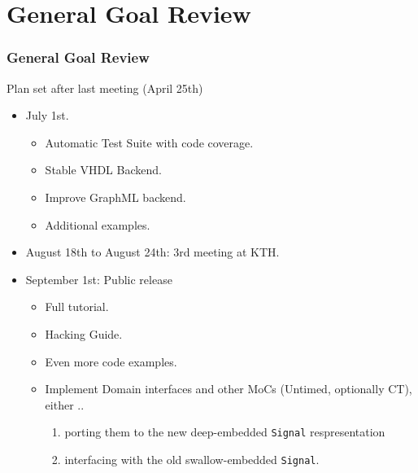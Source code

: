 \documentclass{beamer}
\begin{document}
\section{General Goal Review}
\begin{frame}
  \frametitle{General Goal Review}
  Plan set after last meeting (April 25th)
  \begin{itemize}
  \item<1-> July 1st.
    \begin{itemize}
    \item Automatic Test Suite with code
      coverage. 
    \item Stable VHDL Backend. 
    \item Improve GraphML backend. 
    \item Additional examples. 
    \end{itemize}
  \item<3-> August 18th to August 24th: 3rd meeting at KTH.
    
  \item<4-> September 1st: Public release
    \begin{itemize}
      \item Full tutorial. 
      \item Hacking Guide. 
      \item Even more code examples. 
      \item Implement Domain interfaces and other MoCs (Untimed,
        optionally CT), either
        .. 
        \begin{enumerate}
        \item porting them to the new deep-embedded \texttt{Signal} respresentation
        \item interfacing with the old swallow-embedded \texttt{Signal}.
        \end{enumerate}
    \end{itemize}
  \end{itemize}
\end{frame}
\end{document}
